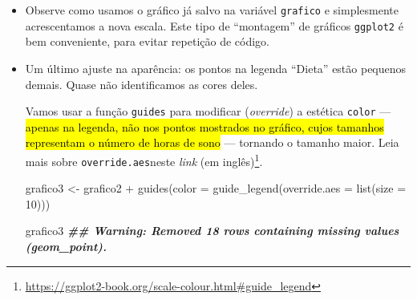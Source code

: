 \documentclass[
  11pt]{report}
\newenvironment{Shaded}{\begin{snugshade}}{\end{snugshade}}
\newcommand{\AttributeTok}[1]{\textcolor[rgb]{0.77,0.63,0.00}{#1}}
\newcommand{\DecValTok}[1]{\textcolor[rgb]{0.00,0.00,0.81}{#1}}
\newcommand{\DocumentationTok}[1]{\textcolor[rgb]{0.56,0.35,0.01}{\textbf{\textit{#1}}}}
\newcommand{\FunctionTok}[1]{\textcolor[rgb]{0.00,0.00,0.00}{#1}}
\newcommand{\NormalTok}[1]{#1}
\newcommand{\OtherTok}[1]{\textcolor[rgb]{0.56,0.35,0.01}{#1}}
\newcommand{\SpecialCharTok}[1]{\textcolor[rgb]{0.00,0.00,0.00}{#1}}
\newcommand{\StringTok}[1]{\textcolor[rgb]{0.31,0.60,0.02}{#1}}
\DeclareRobustCommand{\href}[2]{#2\footnote{\url{#1}}}
\renewenvironment{Shaded}{
  \begin{mdframed}[%
    roundcorner=2pt,%
    innerleftmargin=5pt,%
    innerrightmargin=5pt,%
    topline=true,%
    leftline=true,%
    rightline=true,%
    bottomline=true,%
    linewidth=0.5pt,%
    linecolor=black!20,%
    backgroundcolor=black!2,%
    skipabove=2ex,%
    skipbelow=2.5ex%
  ]%
}
{
  \end{mdframed}
}
\begin{document}
\begin{itemize}
\begin{Shaded}
\begin{Highlighting}[]
\NormalTok{grafico2 }\OtherTok{\textless{}{-}}\NormalTok{ grafico }\SpecialCharTok{+}
  \FunctionTok{scale\_color\_discrete}\NormalTok{(}
    \AttributeTok{palette =} \StringTok{\textquotesingle{}RdBu\textquotesingle{}}\NormalTok{,}
    \AttributeTok{na.value =} \StringTok{\textquotesingle{}black\textquotesingle{}}\NormalTok{,}
    \AttributeTok{type =}\NormalTok{ scale\_color\_brewer}
\NormalTok{  )}

\NormalTok{grafico2}
\DocumentationTok{\#\# Warning: Removed 18 rows containing missing values (geom\_point).}
\end{Highlighting}
\end{Shaded}

  \begin{center}\texttt{[image: \_main\_files/figure-latex/unnamed-chunk-21-1]} \end{center}
\item
  Observe como usamos o gráfico já salvo na variável \texttt{grafico} e simplesmente acrescentamos a nova escala. Este tipo de ``montagem'' de gráficos \texttt{ggplot2} é bem conveniente, para evitar repetição de código.
\item
  Um último ajuste na aparência: os pontos na legenda ``Dieta'' estão pequenos demais. Quase não identificamos as cores deles.

  Vamos usar a função \texttt{guides} para modificar (\emph{override}) a estética \texttt{color} --- {\hl{apenas na legenda, não nos pontos mostrados no gráfico, cujos tamanhos representam o número de horas de sono}} --- tornando o tamanho maior. \href{https://ggplot2-book.org/scale-colour.html\#guide_legend}{Leia mais sobre \texttt{override.aes}neste \emph{link} (em inglês)}.

\begin{Shaded}
\begin{Highlighting}[]
\NormalTok{grafico3 }\OtherTok{\textless{}{-}}\NormalTok{ grafico2 }\SpecialCharTok{+}
  \FunctionTok{guides}\NormalTok{(}\AttributeTok{color =} \FunctionTok{guide\_legend}\NormalTok{(}\AttributeTok{override.aes =} \FunctionTok{list}\NormalTok{(}\AttributeTok{size =} \DecValTok{10}\NormalTok{)))}

\NormalTok{grafico3}
\DocumentationTok{\#\# Warning: Removed 18 rows containing missing values (geom\_point).}
\end{Highlighting}
\end{Shaded}


\end{itemize}
\end{document}
